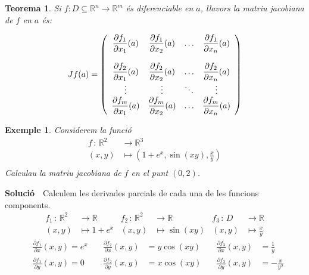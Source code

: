 \documentclass[12pt]{article}
\newcommand{\solucio}{\textbf{Soluci{\'o}}\ \ }
\newtheorem{teorema}{Teorema}[subsection]
\newtheorem{exemple}{Exemple}[subsection]
\newcommand{\R}{\mathbb{R}}
\begin{document}
\vspace{0.4cm}
\begin{teorema}
Si $f:D \subseteq\R^n \longrightarrow \R^m$ {\'e}s diferenciable en
$a$, llavors la matriu jacobiana de $f$ en $a$ {\'e}s:


$$ Jf(a) = \left( \vspace{0.4cm}\begin{array} {cccc}
\displaystyle\frac{\partial f_1}{\partial x_1}(a) & \displaystyle\frac{\partial f_1}{\partial x_2}(a) &
\ldots & \displaystyle\frac{\partial f_1}{\partial x_n}(a)\\
\\
\displaystyle\frac{\partial f_2}{\partial x_1}(a) & \displaystyle\frac{\partial f_2}{\partial x_2}(a) &
\ldots & \displaystyle\frac{\partial f_2}{\partial x_n}(a)\\
\vdots & \vdots & \ddots & \vdots \\
\displaystyle\frac{\partial f_m}{\partial x_1}(a) & \displaystyle\frac{\partial f_m}{\partial x_2}(a) &
\ldots & \displaystyle\frac{\partial f_m}{\partial x_n}(a)\\
                   \end{array} \right) $$
\end{teorema}

\vspace{0.4cm}
\begin{exemple}
Considerem la funci{\'o}
\begin{align*}
    f\, :\, \R^2 & \longrightarrow  \R^3 \\
    (x,y) & \mapsto \left( 1+e^x,\sin(xy),\frac{x}{y} \right) \\
\end{align*}
Calculau la matriu jacobiana de $f$ en el punt $(0,2)$.
\end{exemple}

\solucio Calculem les derivades parcials de cada una de les funcions components.
\vspace{0.4cm}\begin{align*}
   f_1\,  : \, \R^2 & \longrightarrow  \R \quad
  & f_2\, : \, \R^2 & \longrightarrow  \R \quad
  & f_3\, : \, D & \longrightarrow  \R \\
  (x,y) &  \mapsto  1+e^x
  & (x,y) & \mapsto  \sin(xy)
  &(x,y) & \mapsto \frac{x}{y}
\end{align*}
\begin{align*}
& \frac{\partial f_1}{\partial x}(x,y)   = e^x \quad  &
\frac{\partial f_2}{\partial x}(x,y)   & =
  y\cos (xy) \quad    & \frac{\partial f_3}{\partial
x}(x,y)  &  = \frac{1}{y}    \\ & \frac{\partial f_1}{\partial
y}(x,y)   =
 0 \quad  & \frac{\partial f_2}{\partial
y}(x,y)  & =
  x\cos (xy) \quad   & \frac{\partial f_3}{\partial
y}(x,y)  & =
 -\frac{x}{y^2}
  \end{align*}
\end{document}
